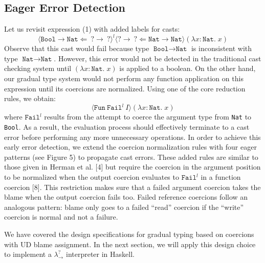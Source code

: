 \subsection{Eager Error Detection}
Let us revisit expression (1) with added labels for casts:
\begin{equation*}
    \langle \texttt{Bool} \rightarrow \texttt{Nat} \Leftarrow  
    \: ? \rightarrow \: ? \rangle ^l 
    \langle ? \rightarrow \: ? \Leftarrow 
    \texttt{Nat} \rightarrow \texttt{Nat} \rangle
    (\lambda x \! : \! \texttt{Nat} . \; x)
\end{equation*}
Observe that this cast would fail because type $\texttt{Bool} \rightarrow 
\texttt{Nat}$ is inconsistent with type $\texttt{Nat} \rightarrow 
\texttt{Nat}$. However, this error would not be detected in the traditional 
cast checking system until $(\lambda x \! : \! \texttt{Nat} . \; x)$ is 
applied to a boolean. On the other hand, our gradual type system would not 
perform any function application on this expression until its coercions are 
normalized. Using one of the core reduction rules, we obtain:
\begin{equation*}
    \langle \texttt{Fun} \: \texttt{Fail}^l \: I \rangle
    (\lambda x \! : \! \texttt{Nat} . \; x)
\end{equation*}
where $\texttt{Fail}^l$ results from the attempt to coerce the argument type 
from \texttt{Nat} to \texttt{Bool}. As a result, 
the evaluation process should effectively terminate to a cast error before 
performing any more unnecessary operations. In order to achieve this 
early error detection, we extend the coercion normalization rules with 
four eager patterns (see Figure 5) to propagate cast errors. These added rules are similar to 
those given in Herman et al. [4] but require the coercion in the argument 
position to be normalized when the output coercion evaluates to $\texttt{Fail}^l$ 
in a function coercion [8]. 
This restriction makes sure that a failed argument coercion takes the blame when 
the output coercion fails too. Failed reference coercions follow an 
analogous pattern: blame only goes to a failed ``read'' coercion if 
the ``write'' coercion is normal and not a failure.

We have covered the design specifications for gradual typing based on coercions 
with UD blame assignment. In the next section, we will apply this design choice 
to implement a $\lambda ^? _{\rightarrow}$ interpreter in Haskell. 